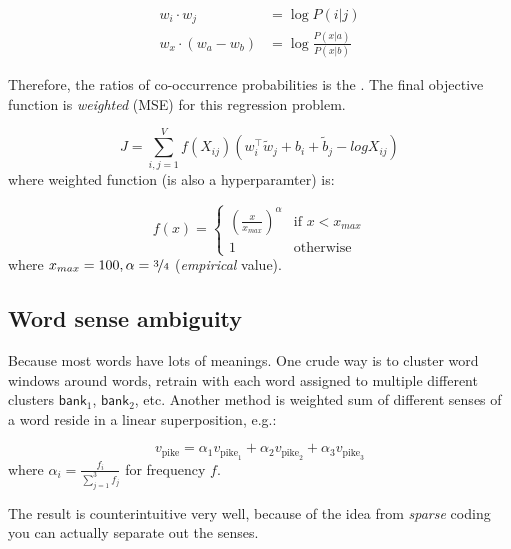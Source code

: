 
\begin{align}
w_i \cdot w_j &= \log P(i|j) \\
w_x \cdot (w_a - w_b) &= \log \frac{P(x|a)}{P(x|b)}
\end{align}

Therefore, the ratios of co-occurrence probabilities is the .
The final objective function is \emph{weighted}  (MSE) for this regression problem.

\begin{equation}
	J = \sum_{i,j=1}^V f(X_{ij})\left(w_i^\top \tilde{w}_j + b_i + \tilde{b}_j - 
	log X_{ij}\right)
\end{equation}
where weighted function (is also a hyperparamter) is:

\begin{equation}
f(x) =
\begin{cases}
	\left(\frac{x}{x_{max}}\right)^\alpha & \text{if } x < x_{max} \\
	1 & \text{otherwise}
\end{cases}
\end{equation}
where $x_{max} = 100, \alpha = \nicefrac{3}{4}$ (\emph{empirical} value). 

\subsection{Word sense ambiguity}
Because most words have lots of meanings.
One crude way  is to cluster word windows around words, retrain with each
word assigned to multiple different clusters $\textsf{bank}_1$, $\textsf{bank}_2$, etc.
Another method  is weighted sum of different senses of a word reside in a linear superposition, e.g.:

\begin{equation}
v_{\text{pike}} = \alpha_1 v_{\text{pike}_1} + \alpha_2 v_{\text{pike}_2} + \alpha_3 v_{\text{pike}_3}
\end{equation}
where $\alpha_i = \frac{f_i}{\sum_{j=1}^3 f_j}$ for frequency $f$.

The result is counterintuitive very well, because of the idea from \emph{sparse} coding you can actually separate out the senses.

